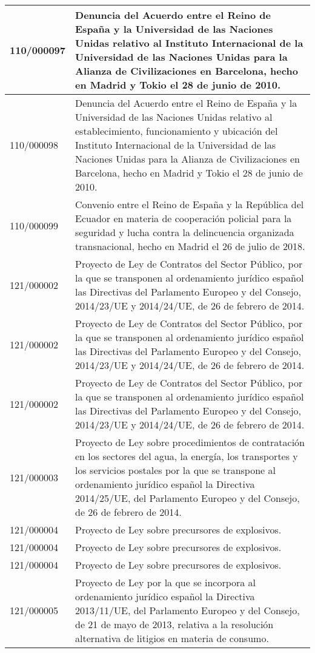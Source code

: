 {\begin{table}[H]
\begin{center}
\begin{tabularx}{\linewidth}{| l | X |}
\hline
110/000097 & Denuncia del Acuerdo entre el Reino de España y la Universidad de las Naciones Unidas relativo al Instituto Internacional de la Universidad de las Naciones Unidas para la Alianza de Civilizaciones en Barcelona, hecho en Madrid y Tokio el 28 de junio de 2010. \\
\hline
110/000098 & Denuncia del Acuerdo entre el Reino de España y la Universidad de las Naciones Unidas relativo al establecimiento, funcionamiento y ubicación del Instituto Internacional de la Universidad de las Naciones Unidas para la Alianza de Civilizaciones en Barcelona, hecho en Madrid y Tokio el 28 de junio de 2010. \\
\hline
110/000099 & Convenio entre el Reino de España y la República del Ecuador en materia de cooperación policial para la seguridad y lucha contra la delincuencia organizada transnacional, hecho en Madrid el 26 de julio de 2018. \\
\hline
121/000002 & Proyecto de Ley de Contratos del Sector Público, por la que se transponen al ordenamiento jurídico español las Directivas del Parlamento Europeo y del Consejo, 2014/23/UE y 2014/24/UE, de 26 de febrero de 2014. \\
\hline
121/000002 & Proyecto de Ley de Contratos del Sector Público, por la que se transponen al ordenamiento jurídico español las Directivas del Parlamento Europeo y del Consejo, 2014/23/UE y 2014/24/UE, de 26 de febrero de 2014. \\
\hline
121/000002 & Proyecto de Ley de Contratos del Sector Público, por la que se transponen al ordenamiento jurídico español las Directivas del Parlamento Europeo y del Consejo, 2014/23/UE y 2014/24/UE, de 26 de febrero de 2014. \\
\hline
121/000003 & Proyecto de Ley sobre procedimientos de contratación en los sectores del agua, la energía, los transportes y los servicios postales por la que se transpone al ordenamiento jurídico español la Directiva 2014/25/UE, del Parlamento Europeo y del Consejo, de 26 de febrero de 2014. \\
\hline
121/000004 & Proyecto de Ley sobre precursores de explosivos. \\
\hline
121/000004 & Proyecto de Ley sobre precursores de explosivos. \\
\hline
121/000004 & Proyecto de Ley sobre precursores de explosivos. \\
\hline
121/000005 & Proyecto de Ley por la que se incorpora al ordenamiento jurídico español la Directiva 2013/11/UE, del Parlamento Europeo y del Consejo, de 21 de mayo de 2013, relativa a la resolución alternativa de litigios en materia de consumo. \\

\end{tabularx}
\end{center}
\end{table}}
